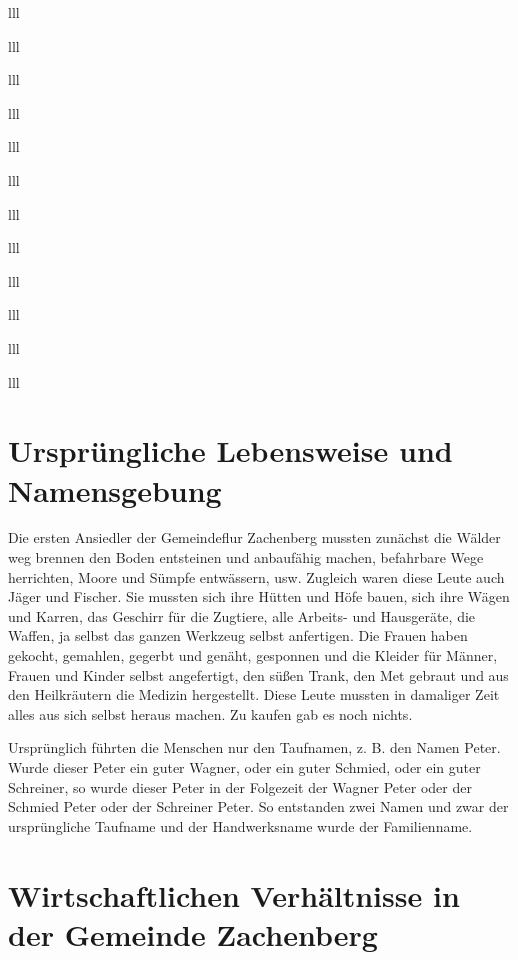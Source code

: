 \documentclass[12pt,a4pager]{book}
\begin{document}
\begin{tabuluar}{lll}
\begin{tabuluar}{lll}
\begin{tabuluar}{lll}
\begin{tabuluar}{lll}
\begin{tabuluar}{lll}
\begin{tabuluar}{lll}
\begin{tabuluar}{lll}
\begin{tabuluar}{lll}
\begin{tabuluar}{lll}
\begin{tabuluar}{lll}
\begin{tabuluar}{lll}
\begin{tabuluar}{lll}
\section{Ursprüngliche Lebensweise und Namensgebung}

Die ersten Ansiedler der Gemeindeflur Zachenberg mussten zunächst die Wälder weg
brennen den Boden entsteinen und anbaufähig machen, befahrbare Wege herrichten,
Moore und Sümpfe entwässern, usw. Zugleich waren diese Leute auch Jäger und
Fischer. Sie mussten sich ihre Hütten und Höfe bauen, sich ihre Wägen und
Karren, das Geschirr für die Zugtiere, alle Arbeits- und Hausgeräte, die Waffen,
ja selbst das ganzen Werkzeug selbst anfertigen. Die Frauen haben gekocht,
gemahlen, gegerbt und genäht, gesponnen und die Kleider für Männer, Frauen und
Kinder selbst angefertigt, den süßen Trank, den Met gebraut und aus den
Heilkräutern die Medizin hergestellt. Diese Leute mussten in damaliger Zeit
alles aus sich selbst heraus machen. Zu kaufen gab es noch nichts.

Ursprünglich führten die Menschen nur den Taufnamen, z. B. den Namen Peter.
Wurde dieser Peter ein guter Wagner, oder ein guter Schmied, oder ein guter
Schreiner, so wurde dieser Peter in der Folgezeit der Wagner Peter oder der
Schmied Peter oder der Schreiner Peter. So entstanden zwei Namen und zwar der
ursprüngliche Taufname und der Handwerksname wurde der Familienname.

\section{Wirtschaftlichen Verhältnisse in der Gemeinde Zachenberg}


\end{tabuluar}
\end{tabuluar}
\end{tabuluar}
\end{tabuluar}
\end{tabuluar}
\end{tabuluar}
\end{tabuluar}
\end{tabuluar}
\end{tabuluar}
\end{tabuluar}
\end{tabuluar}
\end{tabuluar}
\end{document}
